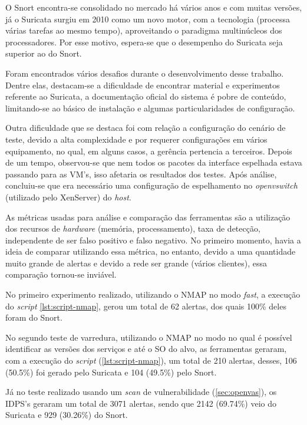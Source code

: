 O Snort encontra-se consolidado no mercado há vários anos e com muitas versões, já o Suricata surgiu em 2010 como um novo motor, com a tecnologia  (processa várias tarefas ao mesmo tempo), aproveitando o paradigma multinúcleos dos processadores. Por esse motivo, espera-se que o desempenho do Suricata seja superior ao do Snort.

Foram encontrados vários desafios durante o desenvolvimento desse trabalho. Dentre elas, destacam-se a dificuldade de encontrar material e experimentos referente ao Suricata, a documentação oficial do sistema é pobre de conteúdo, limitando-se ao básico de instalação e algumas particularidades de configuração. 

Outra dificuldade que se destaca foi com relação a configuração do cenário de teste, devido a alta complexidade e por requerer configurações em vários equipamento, no qual, em alguns casos, a gerência pertencia a terceiros. Depois de um tempo, observou-se que nem todos os pacotes da interface espelhada estava passando para as VM's, isso afetaria os resultados dos testes. Após análise, concluiu-se que era necessário uma configuração de espelhamento no \textit{openvswitch} (utilizado pelo XenServer) do \textit{host}. 

As métricas usadas para análise e comparação das ferramentas são a utilização dos recursos de \textit{hardware} (memória, processamento), taxa de detecção, independente de ser falso positivo e falso negativo. No primeiro momento, havia a ideia de comparar utilizando essa métrica, no entanto, devido a uma quantidade muito grande de alertas e devido a rede ser grande (vários clientes), essa comparação tornou-se inviável.

No primeiro experimento realizado, utilizando o NMAP no modo \textit{fast}, a execução do \textit{script} \autoref{lst:script-nmap}, gerou um total de 62 alertas, dos quais 100\% deles foram do Snort.

No segundo teste de varredura, utilizando o NMAP no modo no qual é possível identificar as versões dos serviços e até o SO do alvo, as ferramentas geraram, com a execução do \textit{script} (\autoref{lst:script-nmap}), um total de 210 alertas, desses, 106 (50.5\%) foi gerado pelo Suricata e 104 (49.5\%) pelo Snort.

Já no teste realizado usando um \textit{scan} de vulnerabilidade (\autoref{sec:openvas}), os IDPS's geraram um total de 3071 alertas, sendo que 2142 (69.74\%) veio do Suricata e 929 (30.26\%) do Snort.

